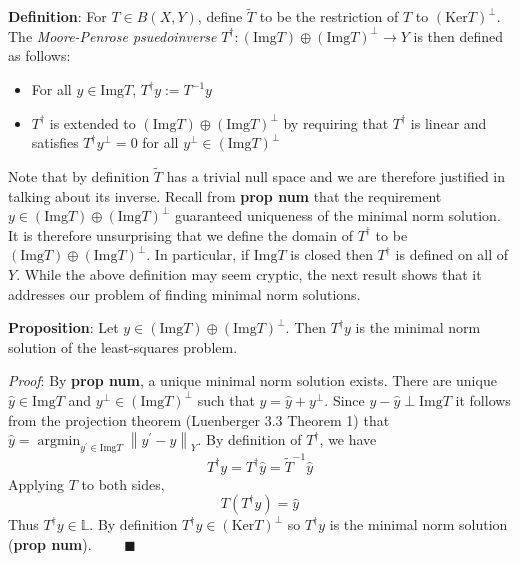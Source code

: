 \documentclass[12pt]{article}
\newcommand*{\norm}[1]{\left\lVert#1\right\rVert}
\newcommand{\Img}{\mathrm{Img}}
\newcommand{\Ker}{\mathrm{Ker}}
\DeclareMathOperator*{\argmin}{argmin}
\begin{document}
 \textbf{Definition}: For $T \in B(X, Y)$, define $\tilde{T}$ to be the restriction of $T$ to $(\Ker T)^\perp$. The \textit{Moore-Penrose psuedoinverse} $T^\dagger : (\Img T) \oplus (\Img T)^\perp \to Y$ is then defined as follows: 
 \begin{itemize} 
 \item For all $y \in \Img T$, $T^\dagger y := T^{-1}y$
 \item $T^\dagger$ is extended to $(\Img T) \oplus (\Img T)^\perp$ by requiring that $T^\dagger$ is linear and satisfies $T^\dagger y^\perp = 0$ for all $y^\perp \in (\Img T)^\perp$
 \end{itemize} 
 
Note that by definition $\tilde{T}$ has a trivial null space and we are therefore justified in talking about its inverse. Recall from \textbf{prop num} that the requirement $y \in (\Img T) \oplus (\Img T)^\perp$ guaranteed uniqueness of the minimal norm solution. It is therefore unsurprising that we define the domain of $T^\dagger$ to be $(\Img T) \oplus (\Img T)^\perp$. In particular, if $\Img T$ is closed then $T^\dagger$ is defined on all of $Y$. While the above definition may seem cryptic, the next result shows that it addresses our problem of finding minimal norm solutions.

\textbf{Proposition}: Let $y \in (\Img T) \oplus (\Img T)^\perp$. Then $T^\dagger y$ is the minimal norm solution of the least-squares problem. 

\smallskip 

\textit{Proof}: By \textbf{prop num}, a unique minimal norm solution exists. There are unique $\hat{y} \in \Img T$ and $y^\perp \in (\Img T)^\perp$ such that $y = \hat{y} + y^\perp$. Since $y - \hat{y} \perp \Img T$ it follows from the projection theorem (Luenberger 3.3 Theorem 1) that $\hat{y} = \argmin_{y^\prime \in \Img T} \norm{y^\prime - y}_Y$. By definition of $T^\dagger$, we have \[T^\dagger y = T^\dagger \hat{y} = \tilde{T}^{-1}\hat{y}\]
 Applying $T$ to both sides, \[T(T^\dagger y) = \hat{y}\]
 Thus $T^\dagger y \in \mathbb{L}$. By definition $T^\dagger y \in (\Ker T)^\perp$ so $T^\dagger y$ is the minimal norm solution (\textbf{prop num}). $\qquad \blacksquare$
 
 
 
 
 
 
 
\end{document}
